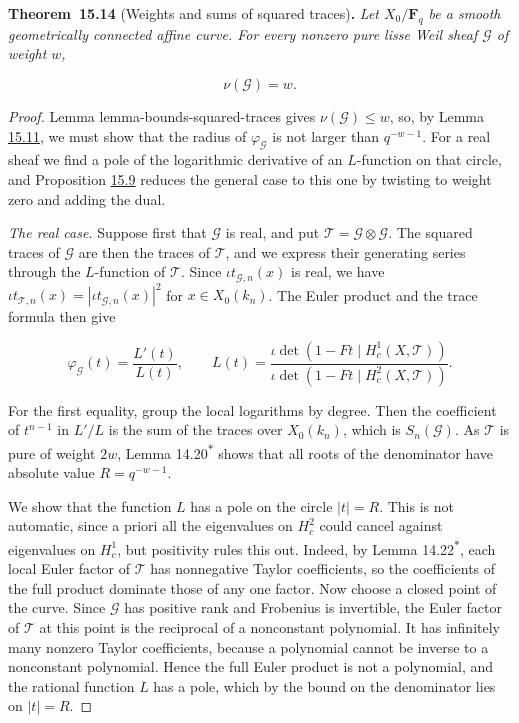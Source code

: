 \documentclass[11pt]{article}
\newenvironment{bpstatement}[2]{\par\addvspace{0.6\baselineskip}\noindent\textbf{#1}#2\textbf{.}\enspace\ignorespaces}
  {\par\addvspace{0.4\baselineskip}}
\newenvironment{bpstatementit}[2]{\begin{bpstatement}{#1}{#2}\itshape\ignorespaces}{\end{bpstatement}}
\newcommand{\bpout}[1]{#1\textsuperscript{\hyperlink{bp-outside}{\ensuremath{\ast}}}}
\begin{document}
\label{bp41}%
\begin{bpstatementit}{Theorem~15.14}{ (Weights and sums of squared traces)}
Let \(X_0/\mathbf F_q\) be a smooth geometrically connected affine curve. For every nonzero pure lisse Weil sheaf \(\mathcal G\) of weight \(w\),

\[
\nu(\mathcal G)=w.
\]
\end{bpstatementit}

\begin{proof}[{Proof}]\label{bp42}%
Lemma lemma-bounds-squared-traces gives \(\nu(\mathcal G)\le w\), so, by Lemma \hyperref[bp32]{15.11}, we must show that the radius of \(\varphi_{\mathcal G}\) is not larger than \(q^{-w-1}\). For a real sheaf we find a pole of the logarithmic derivative of an \(L\)-function on that circle, and Proposition \hyperref[bp27]{15.9} reduces the general case to this one by twisting to weight zero and adding the dual.

\emph{The real case.} Suppose first that \(\mathcal G\) is real, and put \(\mathcal T=\mathcal G\otimes\mathcal G\). The squared traces of \(\mathcal G\) are then the traces of \(\mathcal T\), and we express their generating series through the \(L\)-function of \(\mathcal T\). Since \(\iota t_{\mathcal G,n}(x)\) is real, we have \(\iota t_{\mathcal T,n}(x)=|\iota t_{\mathcal G,n}(x)|^2\) for \(x\in X_0(k_n)\). The Euler product and the trace formula then give

\[
\varphi_{\mathcal G}(t)=\frac{L'(t)}{L(t)},\qquad
L(t)=\frac{\iota\det(1-Ft\mid H_c^1(X,\mathcal T))}
{\iota\det(1-Ft\mid H_c^2(X,\mathcal T))}.
\]

For the first equality, group the local logarithms by degree. Then the coefficient of \(t^{n-1}\) in \(L'/L\) is the sum of the traces over \(X_0(k_n)\), which is \(S_n(\mathcal G)\). As \(\mathcal T\) is pure of weight \(2w\), Lemma \bpout{14.20} shows that all roots of the denominator have absolute value \(R=q^{-w-1}\).

We show that the function \(L\) has a pole on the circle \(|t|=R\). This is not automatic, since a priori all the eigenvalues on \(H^2_c\) could cancel against eigenvalues on \(H^1_c\), but positivity rules this out. Indeed, by Lemma \bpout{14.22}, each local Euler factor of \(\mathcal T\) has nonnegative Taylor coefficients, so the coefficients of the full product dominate those of any one factor. Now choose a closed point of the curve. Since \(\mathcal G\) has positive rank and Frobenius is invertible, the Euler factor of \(\mathcal T\) at this point is the reciprocal of a nonconstant polynomial. It has infinitely many nonzero Taylor coefficients, because a polynomial cannot be inverse to a nonconstant polynomial. Hence the full Euler product is not a polynomial, and the rational function \(L\) has a pole, which by the bound on the denominator lies on \(|t|=R\).


\end{proof}
\end{document}
